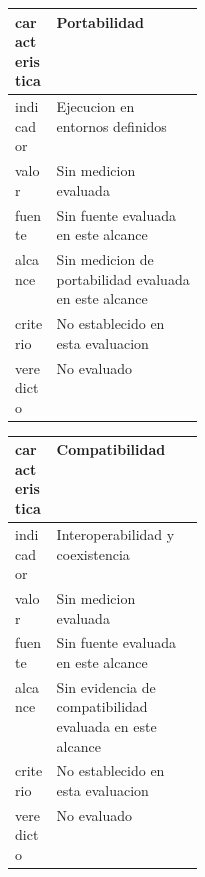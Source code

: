 \par\medskip
\begin{tabularx}{\linewidth}{|p{0.22\linewidth}|X|}
\hline
caracteristica & Portabilidad \\ \hline
indicador & Ejecucion en entornos definidos \\ \hline
valor & Sin medicion evaluada \\ \hline
fuente & Sin fuente evaluada en este alcance \\ \hline
alcance & Sin medicion de portabilidad evaluada en este alcance \\ \hline
criterio & No establecido en esta evaluacion \\ \hline
veredicto & No evaluado \\ \hline
\end{tabularx}
\par\medskip
\begin{tabularx}{\linewidth}{|p{0.22\linewidth}|X|}
\hline
caracteristica & Compatibilidad \\ \hline
indicador & Interoperabilidad y coexistencia \\ \hline
valor & Sin medicion evaluada \\ \hline
fuente & Sin fuente evaluada en este alcance \\ \hline
alcance & Sin evidencia de compatibilidad evaluada en este alcance \\ \hline
criterio & No establecido en esta evaluacion \\ \hline
veredicto & No evaluado \\ \hline
\end{tabularx}
\par\medskip
